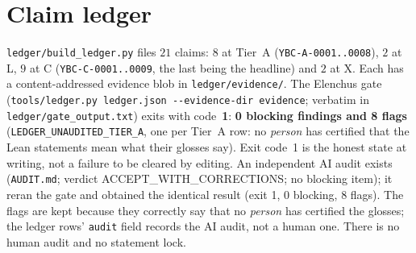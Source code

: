 \documentclass[11pt]{article}
\begin{document}
\section{Claim ledger}\label{sec:ledger}
\texttt{ledger/build\_ledger.py} files $21$ claims: $8$ at Tier~A (\texttt{YBC-A-0001..0008}), $2$ at L, $9$ at C (\texttt{YBC-C-0001..0009}, the last being the headline) and $2$ at X.
Each has a content-addressed evidence blob in \texttt{ledger/evidence/}. The Elenchus gate (\texttt{tools/ledger.py ledger.json -{}-evidence-dir evidence}; verbatim in \texttt{ledger/gate\_output.txt}) exits with code~\textbf{1}:
\textbf{0 blocking findings and 8 flags} (\texttt{LEDGER\_UNAUDITED\_TIER\_A}, one per Tier~A row: no \emph{person} has certified that the Lean statements mean what their glosses say). Exit code~1 is the honest state at writing, not a failure to be cleared by editing. An independent AI audit exists (\texttt{AUDIT.md}; verdict ACCEPT\_WITH\_CORRECTIONS; no blocking item); it reran the gate and obtained the identical result (exit 1, 0 blocking, 8 flags). The flags are kept because they correctly say that no \emph{person} has certified the glosses; the ledger rows' \texttt{audit} field records the AI audit, not a human one. There is no human audit and no statement lock.

\end{document}
